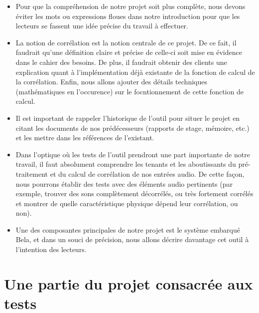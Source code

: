 \documentclass[a4paper]{article}
\begin{document}
\begin{itemize}

\item Pour que la compréhension de notre projet soit plus complète, nous devons éviter les mots ou expressions floues dans notre introduction pour que les lecteurs se fassent une idée précise du travail à effectuer.

\item La notion de corrélation est la notion centrale de ce projet. De ce fait, il faudrait qu'une définition claire et précise de celle-ci soit mise en évidence dans le cahier des besoins. De plus, il faudrait obtenir des clients une explication quant à l'implémentation déjà existante de la fonction de calcul de la corrélation. Enfin, nous allons ajouter des détails techniques (mathématiques en l'occurence) sur le focntionnement de cette fonction de calcul.

\item Il est important de rappeler l'historique de l'outil pour situer le projet en citant les documents de nos prédécesseurs (rapports de stage, mémoire, etc.) et les mettre dans les références de l'existant.

\item Dans l'optique où les tests de l'outil prendront une part importante de notre travail, il faut absolument comprendre les tenants et les aboutissants du pré-traitement et du calcul de corrélation de nos entrées audio. De cette façon, nous pourrons établir des tests avec des éléments audio pertinents (par exemple, trouver des sons complètement décorrélés, ou très fortement corrélés et montrer de quelle caractéristique physique dépend leur corrélation, ou non).

\item Une des composantes principales de notre projet est le système embarqué Bela, et dans un souci de précision, nous allons décrire davantage cet outil à l'intention des lecteurs.

\end{itemize}

\section*{Une partie du projet consacrée aux tests}
\end{document}
